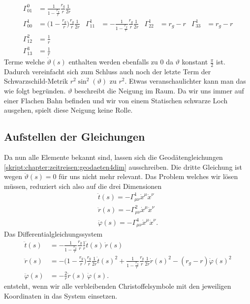 \begin{refsection}
	\begin{align*}
	\Gamma^0_{01}
	&=
	\frac{1}{1-\displaystyle\frac{r_g}{r}}
	\frac{r_g}{r}
	\frac{1}{2r}
	\\
	\Gamma^1_{00}
	&=
	\biggl(1-\displaystyle\frac{r_g}{r}\biggr)
	\frac{r_g}{r}
	\frac{1}{2r}
	&
	\Gamma^1_{11}
	&=
	-\frac1{1-\displaystyle\frac{r_g}{r}}
	\frac{r_g}{r}
	\frac{1}{2r}
	&
	\Gamma^1_{22}
	&=
	r_g-r
	&
	\Gamma^1_{33}
	&=
	r_g-r
	\\
	\Gamma^2_{12}
	&=
	\frac1r
	\\
	\Gamma^3_{13}
	&=
	\frac1r
	\end{align*}
	Terme welche $\dot{\vartheta}(s)$ enthalten werden ebenfalls zu $0$ da $\vartheta$ konstant $\frac{\pi}{2}$ ist. Dadurch vereinfacht sich zum Schluss auch noch der letzte Term der Schwarzschild-Metrik $r^{2}\sin^{2}(\vartheta)$ zu $r^2$. Etwas veranschaulichter kann man das wie folgt begründen. $\vartheta$ beschreibt die Neigung im Raum. Da wir uns immer auf einer Flachen Bahn befinden und wir von einem Statischen schwarze Loch ausgehen, spielt diese Neigung keine Rolle.
	
	
	\subsection{Aufstellen der Gleichungen}
	
	Da nun alle Elemente bekannt sind, lassen sich die Geodätengleichungen \ref{skript:chapter:zeitreisen:geodaeten4dim} ausschreiben. Die dritte Gleichung ist wegen $\ddot{\vartheta}(s)=0$ für uns nicht mehr relevant. Das Problem welches wir lösen müssen, reduziert sich also auf die drei Dimensionen
	\begin{align*}
	\ddot{t}(s) = -\Gamma^{1}_{\mu\nu}\dot{x}^{\mu}\dot{x}^{\nu}\\
	\ddot{r}(s) = -\Gamma^{2}_{\mu\nu}\dot{x}^{\mu}\dot{x}^{\nu}\\
	\ddot{\varphi}(s) = -\Gamma^{4}_{\mu\nu}\dot{x}^{\mu}\dot{x}^{\nu}.
	\end{align*} 
	Das Differentialgleichungssystem
	\begin{equation}\label{finaleq}
	\begin{aligned}
	\ddot t(s)
	&=
	-\frac{1}{1-\displaystyle\frac{r_g}{r}}\frac{r_g}{r}\frac{1}{r}\dot t(s)\,\dot r(s)
	\\
	\ddot r(s)
	&=
	-\biggl(1-\frac{r_g}{r}\biggr)\frac{r_g}{r}\frac1{2r}\dot t(s)^2
	+\frac{1}{1-\displaystyle\frac{r_g}{r}} \frac{r_g}{r}\frac1{2r}\dot r(s)^2
	- (r_g-r) \dot\varphi(s)^2
	\\
	\ddot \varphi(s)
	&=
	-\frac2r \dot r(s)\,\dot\varphi(s).
	\end{aligned}
	\end{equation}
	entsteht, wenn wir alle verbleibenden Christoffelsymbole mit den jeweiligen Koordinaten in das System einsetzen.
	

\end{refsection}
